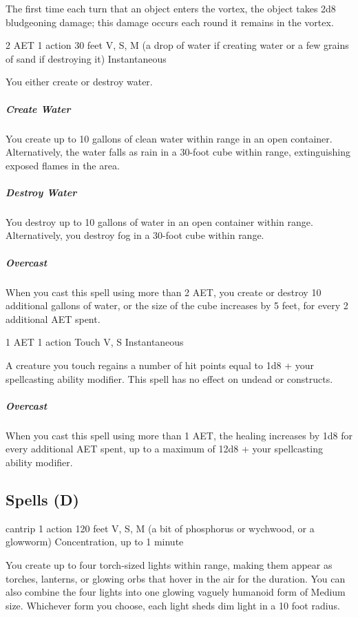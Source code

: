 The first time each turn that an object enters the vortex, the object takes 2d8 bludgeoning damage; this damage occurs each round it remains in the vortex.


{2 AET}
{1 action}
{30 feet}
{V, S, M (a drop of water if creating water or a few grains of sand if destroying it)}
{Instantaneous}

You either create or destroy water.

\subparagraph*{Create Water} You create up to 10 gallons of clean water within range in an open container. Alternatively, the water falls as rain in a 30-foot cube within range, extinguishing exposed flames in the area.

\subparagraph*{Destroy Water} You destroy up to 10 gallons of water in an open container within range. Alternatively, you destroy fog in a 30-foot cube within range.

\subparagraph*{Overcast} When you cast this spell using more than 2 AET, you create or destroy 10 additional gallons of water, or the size of the cube increases by 5 feet, for every 2 additional AET spent.


{1 AET}
{1 action}
{Touch}
{V, S}
{Instantaneous}

A creature you touch regains a number of hit points equal to 1d8 + your spellcasting ability modifier. This spell has no effect on undead or constructs.

\subparagraph*{Overcast} When you cast this spell using more than 1 AET, the healing increases by 1d8 for every additional AET spent, up to a maximum of 12d8 + your spellcasting ability modifier.

\subsection{Spells (D)}


{cantrip}
{1 action}
{120 feet}
{V, S, M (a bit of phosphorus or wychwood, or a glowworm)}
{Concentration, up to 1 minute}

You create up to four torch-sized lights within range, making them appear as torches, lanterns, or glowing orbs that hover in the air for the duration. You can also combine the four lights into one glowing vaguely humanoid form of Medium size. Whichever form you choose, each light sheds dim light in a 10 foot radius.

